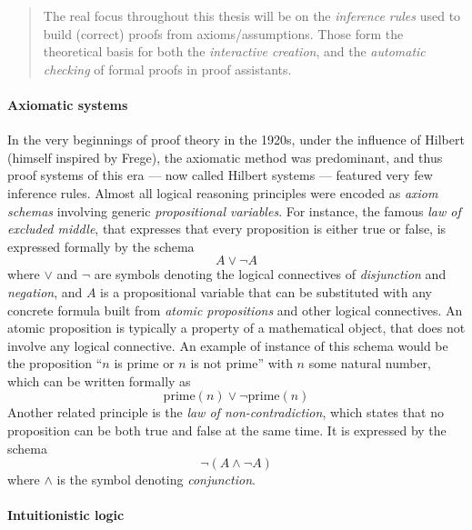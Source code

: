 \begin{framed}
\begin{quote}
The real focus throughout this thesis will be on the \emph{inference rules} used
to build (correct) proofs from axioms/assumptions. Those form the theoretical
basis for both the \emph{interactive creation}, and the \emph{automatic
checking} of formal proofs in proof assistants.
\end{quote}
\end{framed}

\paragraph{Axiomatic systems} 

In the very beginnings of proof theory in the 1920s, under the influence of
Hilbert (himself inspired by Frege), the axiomatic method was predominant, and
thus proof systems of this era --- now called Hilbert systems --- featured very
few inference rules. Almost all logical reasoning principles were encoded as
\emph{axiom schemas} involving generic \emph{propositional variables}. For
instance, the famous \emph{law of excluded middle}, that expresses that every
proposition is either true or false, is expressed formally by the schema
$$A \lor \neg A$$
where $\lor$ and $\neg$ are symbols denoting the logical connectives of
\emph{disjunction} and \emph{negation}, and $A$ is a propositional variable that
can be substituted with any concrete formula built from \emph{atomic
propositions} and other logical connectives. An atomic proposition is typically
a property of a mathematical object, that does not involve any logical
connective. An example of instance of this schema would be the proposition ``$n$
is prime or $n$ is not prime'' with $n$ some natural number, which can be
written formally as
$$\mathrm{prime}(n) \lor \neg\mathrm{prime}(n)$$
Another related principle is the \emph{law of non-contradiction}, which states
that no proposition can be both true and false at the same time. It is expressed
by the schema
$$\neg (A \land \neg A)$$
where $\land$ is the symbol denoting \emph{conjunction}.

\paragraph{Intuitionistic logic}

